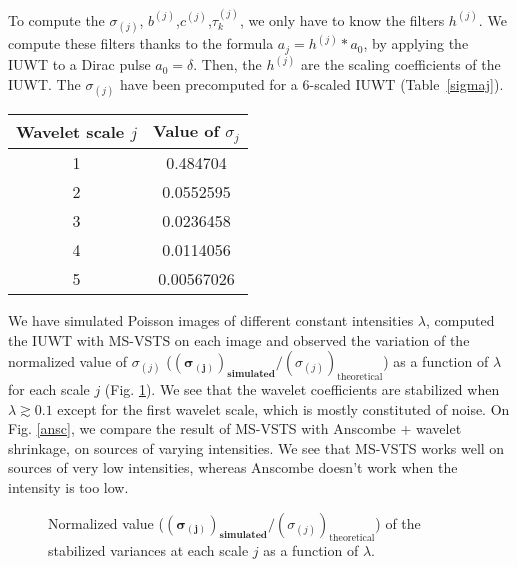 To compute the $\sigma_{(j)}$, $b^{(j)}$,$c^{(j)}$,$\tau_k^{(j)}$, we only have to know the filters $h^{(j)}$. We compute these filters thanks to the formula $a_j = h^{(j)} \ast a_0$, by applying the IUWT to a Dirac pulse $a_0 = \delta$. Then, the $h^{(j)}$ are the scaling coefficients of the IUWT. The $\sigma_{(j)}$ have been precomputed for a 6-scaled IUWT (Table~\ref{sigmaj}). 

\begin{table*}[!h]
  \centering
    \caption{Precomputed values of the variances $\sigma_j$ of the wavelet coefficients.
  }
  \begin{tabular}{|c|c|}
\hline
Wavelet scale $j$ & Value of $\sigma_j$ \\
\hline
  1 & 0.484704 \\
  2 & 0.0552595 \\
  3 & 0.0236458 \\
  4 & 0.0114056 \\
  5 & 0.00567026 \\
\hline
\end{tabular}

  \label{sigmaj}
\end{table*}

We have simulated Poisson images of different constant intensities $\lambda$, computed the IUWT with MS-VSTS on each image and observed the variation of the normalized value of $\sigma_{(j)}$ ($\mathbf{ (\sigma_{(j)})_{\text{simulated}}} / (\sigma_{(j)})_{\text{theoretical}}$) as a function of $\lambda$ for each scale $j$ (Fig. \ref{sigma}). We see that the wavelet coefficients are stabilized when $\lambda \gtrsim 0.1$ except for the first wavelet scale, which is mostly constituted of noise. On Fig. \ref{ansc}, we compare the result of MS-VSTS with Anscombe + wavelet shrinkage, on sources of varying intensities. We see that MS-VSTS works well on sources of very low intensities, whereas Anscombe doesn't work when the intensity is too low.

\begin{figure}[htb]
\caption{Normalized value ($\mathbf{ (\sigma_{(j)})_{\text{simulated}} }/ (\sigma_{(j)})_{\text{theoretical}}$) of the stabilized variances at each scale $j$ as a function of $\lambda$.}
\label{sigma}
\end{figure}

